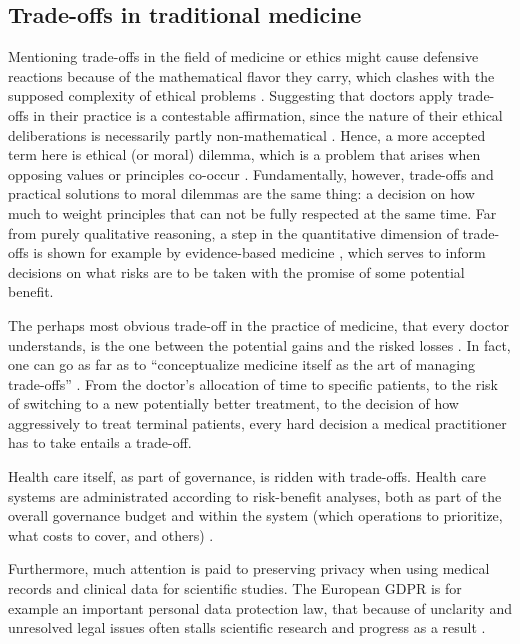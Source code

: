 \subsection{Trade-offs in traditional medicine}
    Mentioning trade-offs in the field of medicine or ethics might cause defensive reactions because of the mathematical flavor they carry, which clashes with the supposed complexity of ethical problems \cite{Williamson2021}.
    Suggesting that doctors apply trade-offs in their practice is a contestable affirmation, since the nature of their ethical deliberations is necessarily partly non-mathematical .
    Hence, a more accepted term here is ethical (or moral) dilemma, which is a problem that arises when opposing values or principles co-occur \cite[p.~351]{Dijkstra2020}.
    Fundamentally, however, trade-offs and practical solutions to moral dilemmas are the same thing: a decision on how much to weight principles that can not be fully respected at the same time.
    Far from purely qualitative reasoning, a step in the quantitative dimension of trade-offs is shown for example by evidence-based medicine \cite{Launer2020}, which serves to inform decisions on what risks are to be taken with the promise of some potential benefit.

    The perhaps most obvious trade-off in the practice of medicine, that every doctor understands, is the one between the potential gains and the risked losses \cite{Launer2020}.
    In fact, one can go as far as to ``conceptualize medicine itself as the art of managing trade-offs'' \cite{Launer2020}.
    From the doctor's allocation of time to specific patients, to the risk of switching to a new potentially better treatment, to the decision of how aggressively to treat terminal patients, every hard decision a medical practitioner has to take entails a trade-off.

    Health care itself, as part of governance, is ridden with trade-offs.
    Health care systems are administrated according to risk-benefit analyses, both as part of the overall governance budget and within the system (which operations to prioritize, what costs to cover, and others) \cite{Dionne2018}.

    Furthermore, much attention is paid to preserving privacy when using medical records and clinical data for scientific studies.
    The European GDPR is for example an important personal data protection law, that because of unclarity and unresolved legal issues often stalls scientific research and progress as a result \cite{Eiss2020}.


